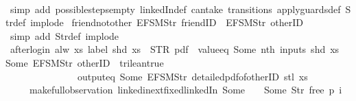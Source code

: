 \begin{isabellebody}
%
\isadelimproof
\ \ %
\endisadelimproof
%
\isatagproof
{}\isamarkupfalse%
\ {\isacharparenleft}simp\ add{\isacharcolon}\ possible{\isacharunderscore}steps{\isacharunderscore}empty\ linkedIn{\isacharunderscore}def\ can{\isacharunderscore}take\ transitions\ apply{\isacharunderscore}guards{\isacharunderscore}def\ Str{\isacharunderscore}def\ implode{\isacharparenright}%
\endisatagproof
{\isafoldproof}%
%
\isadelimproof
\isanewline
%
\endisadelimproof
\isanewline
{}\isamarkupfalse%
\ friend{\isacharunderscore}not{\isacharunderscore}other{\isacharcolon}\ {\isachardoublequoteopen}EFSM{\isachardot}Str\ {\isacharprime}{\isacharprime}friendID{\isacharprime}{\isacharprime}\ {\isasymnoteq}\ EFSM{\isachardot}Str\ {\isacharprime}{\isacharprime}otherID{\isacharprime}{\isacharprime}{\isachardoublequoteclose}\isanewline
%
\isadelimproof
\ \ %
\endisadelimproof
%
\isatagproof
{}\isamarkupfalse%
\ {\isacharparenleft}simp\ add{\isacharcolon}\ Str{\isacharunderscore}def\ implode{\isacharparenright}%
\endisatagproof
{\isafoldproof}%
%
\isadelimproof
\isanewline
%
\endisadelimproof
\isanewline
{}\isamarkupfalse%
\ after{\isacharunderscore}login{\isacharcolon}\ {\isachardoublequoteopen}alw\ {\isacharparenleft}{\isasymlambda}xs{\isachardot}\ label\ {\isacharparenleft}shd\ xs{\isacharparenright}\ {\isacharequal}\ STR\ {\isacharprime}{\isacharprime}pdf{\isacharprime}{\isacharprime}\ {\isasymand}\ value{\isacharunderscore}eq\ {\isacharparenleft}Some\ {\isacharparenleft}nth\ {\isacharparenleft}inputs\ {\isacharparenleft}shd\ xs{\isacharparenright}{\isacharparenright}\ {}{\isacharparenright}{\isacharparenright}\ {\isacharparenleft}Some\ {\isacharparenleft}EFSM{\isachardot}Str\ {\isacharprime}{\isacharprime}otherID{\isacharprime}{\isacharprime}{\isacharparenright}{\isacharparenright}\ {\isacharequal}\ trilean{\isachardot}true\ {\isasymlongrightarrow}\isanewline
\ \ \ \ \ \ \ \ \ \ \ \ \ \ {\isasymnot}\ output{\isacharunderscore}eq\ {\isacharbrackleft}Some\ {\isacharparenleft}EFSM{\isachardot}Str\ {\isacharprime}{\isacharprime}detailed{\isacharunderscore}pdf{\isacharunderscore}of{\isacharunderscore}otherID{\isacharprime}{\isacharprime}{\isacharparenright}{\isacharbrackright}\ {\isacharparenleft}stl\ xs{\isacharparenright}{\isacharparenright}\isanewline
\ \ \ \ \ {\isacharparenleft}make{\isacharunderscore}full{\isacharunderscore}observation\ linkedin{\isacharunderscore}ext{\isacharunderscore}fixed{\isachardot}linkedIn\ {\isacharparenleft}Some\ {}{\isacharparenright}\ {\isacharparenleft}{\isacharless}{\isachargreater}{\isacharparenleft}{}\ {\isachardollar}{\isacharcolon}{\isacharequal}\ Some\ {\isacharparenleft}Str\ {\isacharprime}{\isacharprime}free{\isacharprime}{\isacharprime}{\isacharparenright}{\isacharparenright}{\isacharparenright}\ p\ i{\isacharparenright}{\isachardoublequoteclose}\isanewline

\end{isabellebody}
